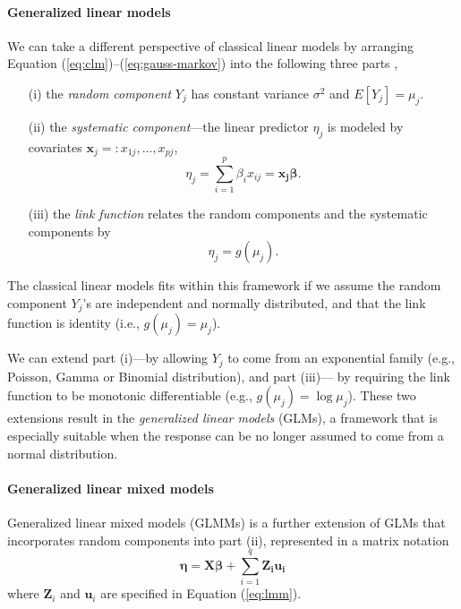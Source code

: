 		
		\paragraph{Generalized linear models}
		
				We can take a different perspective of classical linear models by arranging Equation (\ref{eq:clm})--(\ref{eq:gauss-markov}) into the following three parts \citep[Chapter 2]{mccullagh1989generalized}, 
				\begin{enumerate}
					\item[(i)] the \textit{random component} $Y_j$ has constant variance $\sigma^2$ and
					$E[ Y_j]= \mu_j$.
					\item[(ii)] the \textit{systematic component}---the linear predictor $\eta_j$ is modeled by covariates $\bm x_j =: x_{1j},\ldots, x_{pj}$, 
					\begin{equation}\label{eq:part2}
					\eta_j = \sum_{i=1}^p\beta_i x_{ij}=\bm {x_j\beta}.
					\end{equation}
					\item[(iii)] the \textit{link function} relates the random components and the systematic components by 
					\begin{equation}\label{eq:part3}
					\eta_j = g(\mu_j).
					\end{equation}
					\end{enumerate}
		The classical linear models fits within this framework if we assume the random component $Y_j$'s are independent and normally distributed, and that the link function is identity (i.e., $g(\mu_j)= \mu_j$).
		
		 We can extend part (i)---by allowing $Y_j$ to come from an exponential family (e.g., Poisson, Gamma or Binomial distribution), and part (iii)--- by requiring the link function to be monotonic differentiable (e.g., $g(\mu_j)= \log \mu_j$). These two extensions result in the \textit{generalized linear models} (GLMs), a framework that is especially suitable when the response can be no longer assumed to come from a normal distribution.
		
		
		\paragraph{Generalized linear mixed models}
		Generalized linear mixed models (GLMMs) is a further extension of GLMs that incorporates random components into part (ii), represented in a matrix notation
		\begin{equation}\label{eq:q5}
		\bm \eta = \bm {X\beta} + \sum_{i=1}^q\bm {Z_iu_i}
		\end{equation}
		where  $\bm Z_i$ and $\bm u_i$ are specified in Equation (\ref{eq:lmm}). 
		
